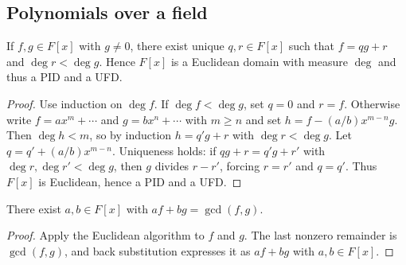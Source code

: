 \subsection{Polynomials over a field}
\begin{proposition}\label{prop:division}
If $f,g\in F[x]$ with $g\neq0$, there exist unique $q,r\in F[x]$ such that $f=qg+r$ and $\deg r<\deg g$. Hence $F[x]$ is a Euclidean domain with measure $\deg$ and thus a PID and a UFD.
\end{proposition}
\begin{proof}
Use induction on $\deg f$. If $\deg f<\deg g$, set $q=0$ and $r=f$. Otherwise write $f=a x^{m}+\cdots$ and $g=b x^{n}+\cdots$ with $m\ge n$ and set $h=f-(a/b)x^{m-n}g$. Then $\deg h<m$, so by induction $h=q'g+r$ with $\deg r<\deg g$. Let $q=q'+(a/b)x^{m-n}$. Uniqueness holds: if $qg+r=q'g+r'$ with $\deg r,\deg r'<\deg g$, then $g$ divides $r-r'$, forcing $r=r'$ and $q=q'$. Thus $F[x]$ is Euclidean, hence a PID and a UFD.
\end{proof}
\begin{corollary}
There exist $a,b\in F[x]$ with $a f + b g = \gcd(f,g)$.
\end{corollary}
\begin{proof}
Apply the Euclidean algorithm to $f$ and $g$. The last nonzero remainder is $\gcd(f,g)$, and back substitution expresses it as $af+bg$ with $a,b\in F[x]$.
\end{proof}

